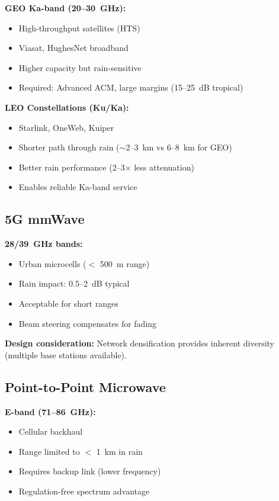 \textbf{GEO Ka-band (20--30~GHz):}
\begin{itemize}
\item High-throughput satellites (HTS)
\item Viasat, HughesNet broadband
\item Higher capacity but rain-sensitive
\item Required: Advanced ACM, large margins (15--25~dB tropical)
\end{itemize}

\textbf{LEO Constellations (Ku/Ka):}
\begin{itemize}
\item Starlink, OneWeb, Kuiper
\item Shorter path through rain ($\sim$2--3~km vs 6--8~km for GEO)
\item Better rain performance (2--3$\times$ less attenuation)
\item Enables reliable Ka-band service
\end{itemize}

\subsection{5G mmWave}

\textbf{28/39~GHz bands:}
\begin{itemize}
\item Urban microcells ($<$ 500~m range)
\item Rain impact: 0.5--2~dB typical
\item Acceptable for short ranges
\item Beam steering compensates for fading
\end{itemize}

\textbf{Design consideration:} Network densification provides inherent diversity (multiple base stations available).

\subsection{Point-to-Point Microwave}

\textbf{E-band (71--86~GHz):}
\begin{itemize}
\item Cellular backhaul
\item Range limited to $<$ 1~km in rain
\item Requires backup link (lower frequency)
\item Regulation-free spectrum advantage
\end{itemize}


